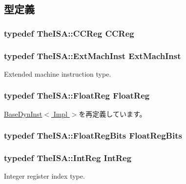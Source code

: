\subsection{型定義}
\hypertarget{classBaseO3DynInst_a0c9de550a32808e6a25b54b6c791d5ab}{
\subsubsection[{CCReg}]{\setlength{\rightskip}{0pt plus 5cm}typedef TheISA::CCReg {\bf CCReg}}}
\label{classBaseO3DynInst_a0c9de550a32808e6a25b54b6c791d5ab}
\hypertarget{classBaseO3DynInst_a5605d4fc727eae9e595325c90c0ec108}{
\subsubsection[{ExtMachInst}]{\setlength{\rightskip}{0pt plus 5cm}typedef TheISA::ExtMachInst {\bf ExtMachInst}}}
\label{classBaseO3DynInst_a5605d4fc727eae9e595325c90c0ec108}
Extended machine instruction type. \hypertarget{classBaseO3DynInst_a75484259f1855aabc8d74c6eb1cfe186}{
\subsubsection[{FloatReg}]{\setlength{\rightskip}{0pt plus 5cm}typedef TheISA::FloatReg {\bf FloatReg}}}
\label{classBaseO3DynInst_a75484259f1855aabc8d74c6eb1cfe186}


\hyperlink{classBaseDynInst_a75484259f1855aabc8d74c6eb1cfe186}{BaseDynInst$<$ Impl $>$}を再定義しています。\hypertarget{classBaseO3DynInst_aab5eeae86499f9bfe15ef79360eccc64}{
\subsubsection[{FloatRegBits}]{\setlength{\rightskip}{0pt plus 5cm}typedef TheISA::FloatRegBits {\bf FloatRegBits}}}
\label{classBaseO3DynInst_aab5eeae86499f9bfe15ef79360eccc64}
\hypertarget{classBaseO3DynInst_a1355cb78d031430d4d70eb5080267604}{
\subsubsection[{IntReg}]{\setlength{\rightskip}{0pt plus 5cm}typedef TheISA::IntReg {\bf IntReg}}}
\label{classBaseO3DynInst_a1355cb78d031430d4d70eb5080267604}
Integer register index type. 

